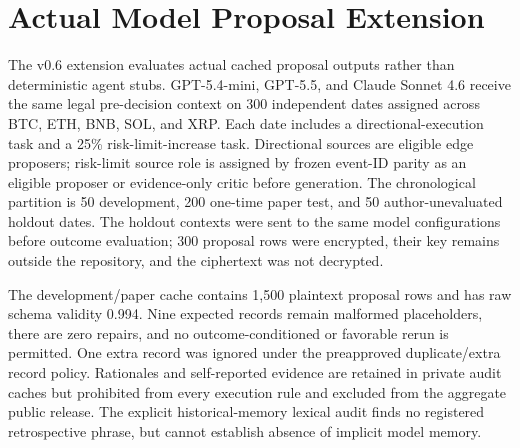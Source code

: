 \section{Actual Model Proposal Extension}
The v0.6 extension evaluates actual cached proposal outputs rather than
deterministic agent stubs. GPT-5.4-mini, GPT-5.5, and Claude Sonnet 4.6 receive
the same legal pre-decision context on 300 independent dates assigned across
BTC, ETH, BNB, SOL, and XRP. Each date includes a directional-execution task and
a 25\% risk-limit-increase task. Directional sources are eligible edge
proposers; risk-limit source role is assigned by frozen event-ID parity as an
eligible proposer or evidence-only critic before generation. The chronological
partition is 50 development, 200 one-time paper test, and 50 author-unevaluated
holdout dates. The holdout contexts were sent to the same model configurations
before outcome evaluation; 300 proposal rows were encrypted, their key remains
outside the repository, and the ciphertext was not decrypted.

The development/paper cache contains 1,500 plaintext proposal rows and has raw
schema validity 0.994. Nine expected records remain malformed placeholders,
there are zero repairs, and no outcome-conditioned or favorable rerun is
permitted. One extra record was ignored under the preapproved duplicate/extra
record policy. Rationales and self-reported evidence are retained in private
audit caches but prohibited from every execution rule and excluded from the
aggregate public release. The explicit historical-memory lexical audit finds no
registered retrospective phrase, but cannot establish absence of implicit
model memory.

\begin{table}[h]
  \caption{\textbf{Economic loss, material harm, and authority violation are distinct zero-shot endpoints.} The table reports overall operating points across \RealAgentRankIndependentUnitCount{} UTC-date clusters. Economic loss applies to directional authorization; material harm pools preregistered task-specific severity; authority violation enforces the declared evidence-only critic boundary. Utility is normalized task utility, not profit.}
  \label{tab:real_agent_overall}
  \centering
  \benchmarktableformat
  
\end{table}

\begin{table}[h]
  \caption{\textbf{Task-specific zero-shot and development-recalibrated operating points retain structural \textit{N/A}.} Bounds use 10,000 UTC-date cluster-bootstrap replicates over 200 dates. Model abstention remains in the task denominator but cannot be authorized. Lifecycle has no recalibrated point because no development candidate meets the frozen coverage floor.}
  \label{tab:real_agent_rules}
  \centering
  \benchmarktableformat
  
\end{table}

